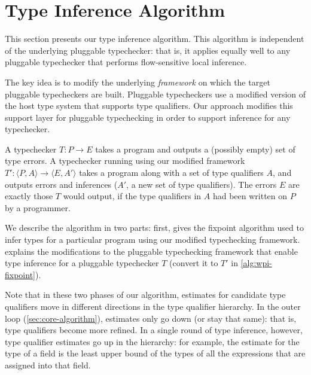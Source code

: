 \section{Type Inference Algorithm}
\label{sec:algorithm}

This section presents our type inference algorithm. This algorithm is
independent of the underlying pluggable typechecker: that is,
it applies equally well to any pluggable typechecker that performs flow-sensitive
local inference.


The key idea is to modify the underlying \emph{framework}
on which the target pluggable typecheckers are built. Pluggable
typecheckers use a modified version of the host type system
that supports type qualifiers. Our approach modifies this support
layer for pluggable typechecking in order to support inference for
any typechecker.

A typechecker $T : P \rightarrow E$
takes a program and outputs a (possibly empty) set of
type errors.  A typechecker running using our modified framework
$T' : \langle P, A \rangle \rightarrow \langle E, A' \rangle$
takes a program along with a set of type qualifiers $A$, and outputs errors and
inferences (\ie $A'$, a new set of type qualifiers).
The errors $E$ are exactly those $T$ would output, if the
type qualifiers in $A$ had been written on $P$ by a programmer.

We describe the algorithm in two parts: first,
 gives the fixpoint
algorithm used to infer types for a particular program
using our modified typechecking framework.
 explains the modifications to the pluggable
typechecking framework that enable type inference for a pluggable
typechecker $T$ (\ie convert it to $T'$ in \cref{alg:wpi-fixpoint}).

Note that in these two phases of our algorithm, estimates for
candidate type qualifiers move in different directions in the
type qualifier hierarchy.
%
In the outer loop (\cref{sec:core-algorithm}),
estimates only go down (or stay that same): that is,
type qualifiers become more refined.
%
In a single round of type inference, however, type qualifier
estimates go up in the hierarchy: for example, the estimate
for the type of a field is the least upper bound of the types
of all the expressions that are assigned into that field.

